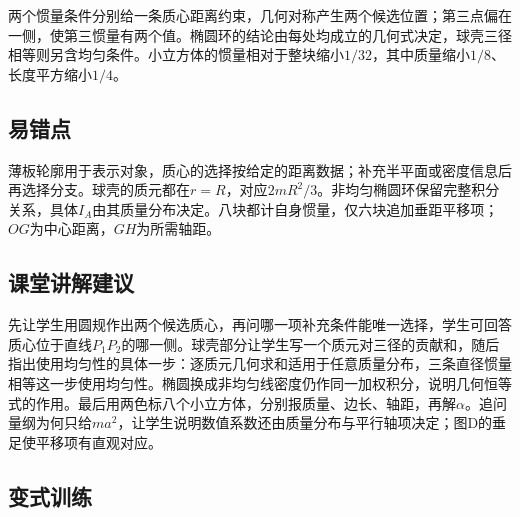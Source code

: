 \documentclass[UTF8,fontset=fandol,a4paper,11pt]{ctexart}
\begin{document}
两个惯量条件分别给一条质心距离约束，几何对称产生两个候选位置；第三点偏在一侧，使第三惯量有两个值。椭圆环的结论由每处均成立的几何式决定，球壳三径相等则另含均匀条件。小立方体的惯量相对于整块缩小$1/32$，其中质量缩小$1/8$、长度平方缩小$1/4$。



\subsection*{易错点}

薄板轮廓用于表示对象，质心的选择按给定的距离数据；补充半平面或密度信息后再选择分支。球壳的质元都在$r=R$，对应$2mR^2/3$。非均匀椭圆环保留完整积分关系，具体$I_A$由其质量分布决定。八块都计自身惯量，仅六块追加垂距平移项；$OG$为中心距离，$GH$为所需轴距。



\subsection*{课堂讲解建议}

先让学生用圆规作出两个候选质心，再问哪一项补充条件能唯一选择，学生可回答质心位于直线$P_1P_2$的哪一侧。球壳部分让学生写一个质元对三径的贡献和，随后指出使用均匀性的具体一步：逐质元几何求和适用于任意质量分布，三条直径惯量相等这一步使用均匀性。椭圆换成非均匀线密度仍作同一加权积分，说明几何恒等式的作用。最后用两色标八个小立方体，分别报质量、边长、轴距，再解$\alpha$。追问量纲为何只给$ma^2$，让学生说明数值系数还由质量分布与平行轴项决定；图D的垂足使平移项有直观对应。



\subsection*{变式训练}
\end{document}
